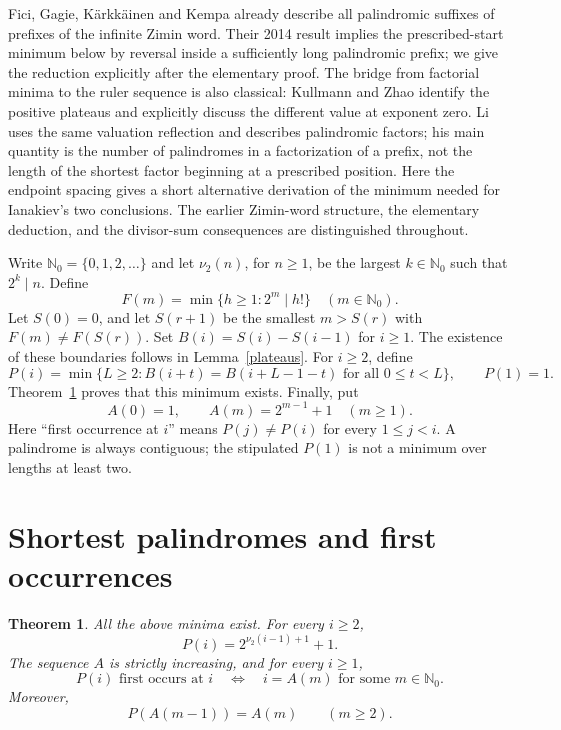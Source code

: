 \documentclass[11pt]{article}
\newtheorem{theorem}{Theorem}
\newcommand{\vv}{\nu_2}
\newcommand{\NN}{\mathbb N}
\begin{document}
Fici, Gagie, K\"arkk\"ainen and Kempa \cite[Section 5, Lemma 12 and
its proof]{fgkk} already describe all palindromic suffixes of prefixes
of the infinite Zimin word. Their 2014 result implies the prescribed-start
minimum below by reversal inside a sufficiently long palindromic prefix;
we give the reduction explicitly after the elementary proof.
The bridge from factorial minima to the ruler sequence is also classical:
Kullmann and Zhao \cite[Lemma 3.11 and Example 3.7]{kz} identify the
positive plateaus and explicitly discuss the different value at exponent
zero. Li \cite[Section 4, Fact 2 and Proposition 2]{li} uses the
same valuation reflection and describes palindromic factors; his main
quantity is the number of palindromes in a factorization of a prefix,
not the length of the shortest factor beginning at a prescribed position.
Here the endpoint spacing gives a short alternative derivation of the
minimum needed for Ianakiev's two conclusions. The earlier Zimin-word
structure, the elementary deduction, and the divisor-sum consequences
are distinguished throughout.

Write $\NN_0=\{0,1,2,\ldots\}$ and let $\vv(n)$, for $n\ge1$, be the
largest $k\in\NN_0$ such that $2^k\mid n$. Define
\[
 F(m)=\min\{h\ge1:2^m\mid h!\}\quad(m\in\NN_0).
\]
Let $S(0)=0$, and let $S(r+1)$ be the smallest $m>S(r)$ with
$F(m)\ne F(S(r))$. Set $B(i)=S(i)-S(i-1)$ for $i\ge1$.
The existence of these boundaries follows in Lemma~\ref{plateaus}.
For $i\ge2$, define
\[
 P(i)=\min\{L\ge2:B(i+t)=B(i+L-1-t)\text{ for all }0\le t<L\},
 \qquad P(1)=1.
\]
Theorem~\ref{main} proves that this minimum exists. Finally, put
\[
 A(0)=1,\qquad A(m)=2^{m-1}+1\quad(m\ge1).
\]
Here ``first occurrence at $i$'' means $P(j)\ne P(i)$ for every
$1\le j<i$. A palindrome is always contiguous; the stipulated $P(1)$
is not a minimum over lengths at least two.

\section{Shortest palindromes and first occurrences}
\begin{theorem}\label{main}
All the above minima exist. For every $i\ge2$,
\begin{equation}\label{minimum}
 P(i)=2^{\vv(i-1)+1}+1.
\end{equation}
The sequence $A$ is strictly increasing, and for every $i\ge1$,
\begin{equation}\label{first}
 P(i)\text{ first occurs at }i
 \quad\Longleftrightarrow\quad i=A(m)\text{ for some }m\in\NN_0.
\end{equation}
Moreover,
\begin{equation}\label{position}
 P(A(m-1))=A(m)\qquad(m\ge2).
\end{equation}
\end{theorem}
\end{document}
